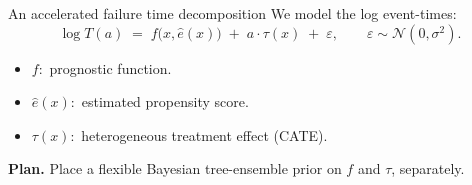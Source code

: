 \documentclass[10pt,aspectratio=169]{beamer}
\newcommand{\N}{\mathcal{N}}
\begin{document}
\begin{frame}{An accelerated failure time decomposition}
We model the log event-times:
\[
\log T(a) \;=\; f\bigl(x, \hat e(x)\bigr) \;+\; a \cdot \tau(x) \;+\; \varepsilon,
\qquad \varepsilon \sim \N(0, \sigma^2).
\]

\smallskip

\begin{itemize}
  \item $f$:\, prognostic function.
  \item $\hat e(x)$:\, estimated propensity score.
  \item $\tau(x)$:\, heterogeneous treatment effect (CATE).
\end{itemize}

\bigskip

\textbf{Plan.} Place a flexible Bayesian tree-ensemble prior on $f$ and $\tau$, separately.
\end{frame}
\end{document}

